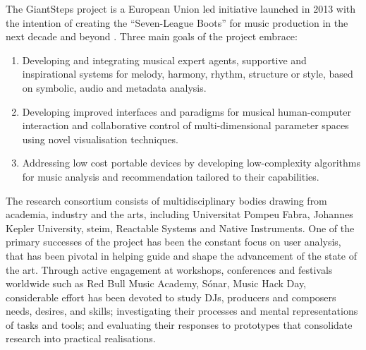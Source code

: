 %

The GiantSteps project is a European Union led initiative launched in 2013 with the intention of creating the ``Seven-League Boots'' for music production in the next decade and beyond \citep{Knees2016a}. Three main goals of the project embrace:

\begin{enumerate}
  \item Developing and integrating musical expert agents, supportive and inspirational systems for melody, harmony, rhythm, structure or style, based on symbolic, audio and metadata analysis.
  \item Developing improved interfaces and paradigms for musical human-computer interaction and collaborative control of multi-dimensional parameter spaces using novel visualisation techniques.
  \item Addressing low cost portable devices by developing low-complexity algorithms for music analysis and recommendation tailored to their capabilities.
\end{enumerate}

The research consortium consists of multidisciplinary bodies drawing from academia, industry and the arts, including Universitat Pompeu Fabra, Johannes Kepler University, \acrshort{steim}, Reactable Systems and Native Instruments. One of the primary successes of the project has been the constant focus on user analysis, that has been pivotal in helping guide and shape the advancement of the state of the art. Through active engagement at workshops, conferences and festivals worldwide such as Red Bull Music Academy, Sónar, Music Hack Day, considerable effort has been devoted to study DJs, producers and composers needs, desires, and skills; investigating their processes and mental representations of tasks and tools; and evaluating their responses to prototypes that consolidate research into practical realisations. 

